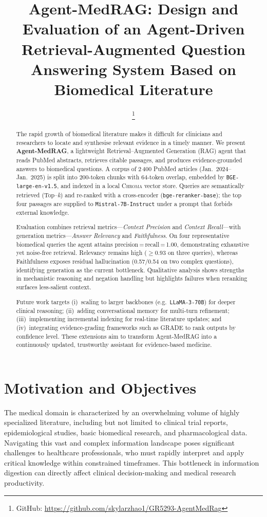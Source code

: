 \documentclass[conference]{IEEEtran}
\title{Agent-MedRAG: Design and Evaluation of an Agent-Driven Retrieval-Augmented Question Answering System Based on Biomedical Literature}
\author{
  \IEEEauthorblockN{Xinglan Zhao\IEEEauthorrefmark{1} \qquad Chuyang Su\IEEEauthorrefmark{2}}
  \IEEEauthorblockA{Graduate School of Arts and Sciences, Columbia University, New York, NY, USA}
  \IEEEauthorblockA{\IEEEauthorrefmark{1}xz3420@columbia.edu \quad \IEEEauthorrefmark{2}cs4570@columbia.edu}
  \thanks{GitHub: \url{https://github.com/skylarzhao1/GR5293-AgentMedRag}}
}
\begin{document}
\maketitle
\begin{abstract}
The rapid growth of biomedical literature makes it difficult for clinicians and researchers to locate and synthesise relevant evidence in a timely manner.  
We present \textbf{Agent-MedRAG}, a lightweight Retrieval--Augmented Generation (RAG) agent that reads PubMed abstracts, retrieves citable passages, and produces evidence-grounded answers to biomedical questions.  
A corpus of 2\,400 PubMed articles (Jan.\ 2024--Jan.\ 2025) is split into 200-token chunks with 64-token overlap, embedded by \texttt{BGE-large-en-v1.5}, and indexed in a local \textsc{Chroma} vector store.  
Queries are semantically retrieved (Top–\emph{k}) and re-ranked with a cross-encoder (\texttt{bge-reranker-base}); the top four passages are supplied to \texttt{Mistral-7B-Instruct} under a prompt that forbids external knowledge.

Evaluation combines retrieval metrics—\emph{Context Precision} and \emph{Context Recall}—with generation metrics—\emph{Answer Relevancy} and \emph{Faithfulness}.  
On four representative biomedical queries the agent attains precision\,=\,recall\,=\,1.00, demonstrating exhaustive yet noise-free retrieval.  
Relevancy remains high ($\ge0.93$ on three queries), whereas Faithfulness exposes residual hallucination (0.57/0.54 on two complex questions), identifying generation as the current bottleneck.  
Qualitative analysis shows strengths in mechanistic reasoning and negation handling but highlights failures when reranking surfaces less-salient context.

Future work targets (i)~scaling to larger backbones (e.g.\ \texttt{LLaMA-3-70B}) for deeper clinical reasoning; 
(ii)~adding conversational memory for multi-turn refinement; 
(iii)~implementing incremental indexing for real-time literature updates; and 
(iv)~integrating evidence-grading frameworks such as GRADE to rank outputs by confidence level.  
These extensions aim to transform Agent-MedRAG into a continuously updated, trustworthy assistant for evidence-based medicine.
\end{abstract}

\section{Motivation and Objectives}

The medical domain is characterized by an overwhelming volume of highly specialized literature, including but not limited to clinical trial reports, epidemiological studies, basic biomedical research, and pharmacological data. Navigating this vast and complex information landscape poses significant challenges to healthcare professionals, who must rapidly interpret and apply critical knowledge within constrained timeframes. This bottleneck in information digestion can directly affect clinical decision-making and medical research productivity.
\end{document}
